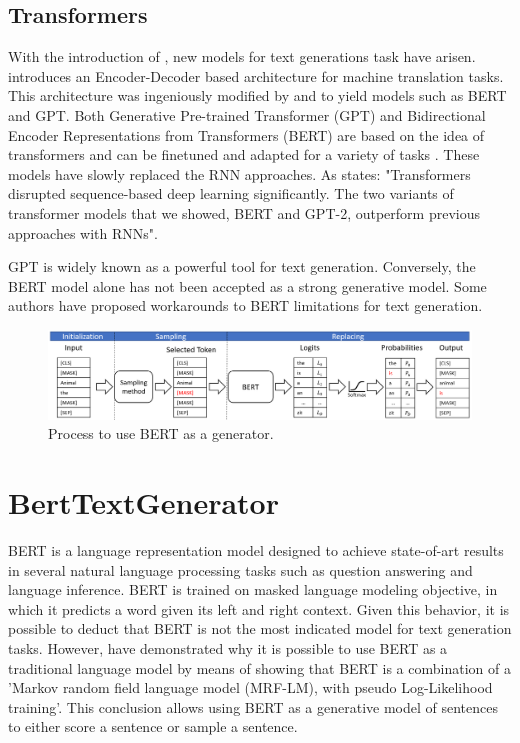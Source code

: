 \documentclass[10pt,twocolumn,letterpaper]{article}
\begin{document}
\subsection{Transformers}

With the introduction of \cite{attention}, new models for text generations task have arisen.
\cite{attention} introduces an Encoder-Decoder based architecture for machine translation tasks.
This architecture was ingeniously modified by \cite{bert} and \cite{gpt} to yield models such as BERT and GPT.
Both Generative Pre-trained Transformer (GPT) and Bidirectional Encoder Representations from Transformers (BERT)
are based on the idea of transformers and can be finetuned and
adapted for a variety of tasks \cite{gptapps1} \cite{gptapps2} \cite{gptapps3} \cite{gptapps4} \cite{gptapps5}.
These models have slowly replaced the RNN approaches.
As \cite{modernMethods} states: "Transformers disrupted sequence-based deep learning significantly.
The two variants of transformer models that we showed, BERT and GPT-2, outperform
previous approaches with RNNs".

GPT is widely known as a powerful tool for text generation.
Conversely, the BERT model alone has not been accepted as a strong generative model.
Some authors \cite{wang2019bert} have proposed workarounds to BERT limitations for text generation.

\begin{figure}[t]
   \centering
   \includegraphics[scale=0.6]{BERTfunc.PNG}
   \caption{Process to use BERT as a generator.}
   \label{fig:BertFig}
\end{figure}

\section{BertTextGenerator}
BERT is a language representation model designed to achieve state-of-art results
in several natural language processing tasks such as question answering and language inference.
BERT is trained on masked language modeling objective, in which it predicts a word given its
left and right context.
Given this behavior, it is possible to deduct that BERT is not the most
indicated model for text generation tasks.
However, \cite{wang2019bert} have demonstrated why it is possible to use BERT as a traditional
language model by means of showing that BERT is a combination of a 'Markov random field
language model (MRF-LM), with pseudo Log-Likelihood training'.
This conclusion allows using BERT as a generative model of sentences to either score a sentence or
sample a sentence.
\end{document}
